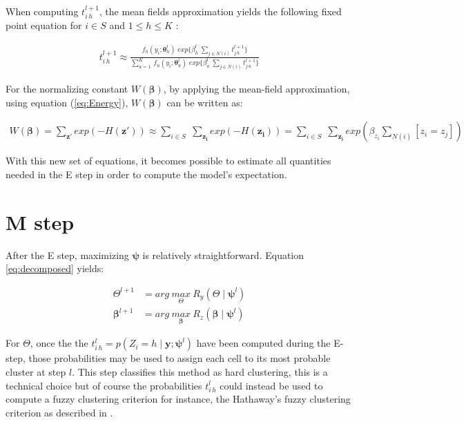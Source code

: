 When computing $t_{i\,h}^{l+1}$, the mean fields approximation yields the following fixed point equation for $i \in S$ and $1 \leq h \leq K$ \cite{Dang98}:

\begin{align}
\label{eq:fixedpoint}
t_{i\,h}^{l+1} \approx \frac{f_{h} (y_i;\boldsymbol{\theta}_{h}^l)\; exp\{\beta_h^l \: \sum_{j \in N(i)} t_{j\,h}^{l+1}\}}{\sum_{u=1}^K \: f_{u} (y_i;\boldsymbol{\theta}_{u}^l)\; exp\{\beta_u^l \: \sum_{j \in N(i)} t_{j\,u}^{l+1}\}}
\end{align}

For the normalizing constant $W(\boldsymbol{\beta})$, by applying the mean-field approximation, using equation (\ref{eq:Energy}), $W(\boldsymbol{\beta})$ can be written as:

\begin{align*}
W(\boldsymbol{\beta}) = \sum\limits_{\boldsymbol{z'}} exp(-H(\boldsymbol{z'})) \approx \sum\limits_{i \in S}\;\sum\limits_{\boldsymbol{z_i}} exp(-H(\boldsymbol{z_i})) = \sum\limits_{i \in S}\;\sum\limits_{\boldsymbol{z_i}} exp(\beta_{z_i}\sum\limits_{N(i)}[z_i=z_j])
\end{align*}

With this new set of equations, it becomes possible to estimate all quantities needed in the E step in order to compute the model's expectation.\\

\section{M step}
After the E step, maximizing $\boldsymbol{\psi}$ is relatively straightforward. Equation \ref{eq:decomposed} yields:

\begin{align*}
\Theta^{l+1} &= arg\:\underset{\Theta}{max}\:R_y(\Theta\mid \boldsymbol{\psi}^l)\\
\boldsymbol{\beta}^{l+1} &= arg\:\underset{\boldsymbol{\beta}}{max}\:R_z(\boldsymbol{\beta}\mid \boldsymbol{\psi}^l)
\end{align*}

For $\Theta$, once the the $t_{i\,h}^{l} = p(Z_i = h \mid \boldsymbol{y};\boldsymbol{\psi}^{l})$ have been computed during the E-step, those probabilities may be used to assign each cell to its most probable cluster at step $l$. This step classifies this method as hard clustering, this is a technical choice but of course the probabilities $t_{i\,h}^{l}$ could instead be used to compute a fuzzy clustering criterion for instance, the Hathaway's fuzzy clustering criterion as described in \cite{Dang98}.\\
 
